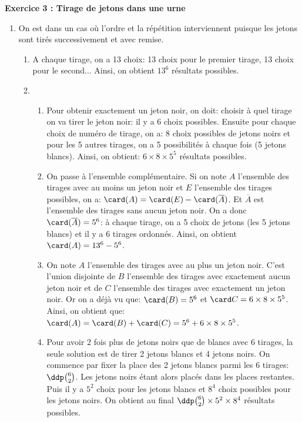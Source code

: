 \documentclass[a4paper, 11pt,reqno]{article}
\begin{document}
\begin{correction}  \; \textbf{Exercice 3 : Tirage de jetons dans une urne}
\begin{enumerate}
 \item On est dans un cas o\`u l'ordre et la r\'ep\'etition interviennent puisque les jetons sont tir\'es successivement et avec remise. 
\begin{enumerate}
\item A chaque tirage, on a 13 choix: 13 choix pour le premier tirage, 13 choix pour le second... Ainsi, on obtient $13^6$ r\'esultats possibles.
\item 
\begin{enumerate}
\item Pour obtenir exactement un jeton noir, on doit: choisir \`a quel tirage on va tirer le jeton noir: il y a 6 choix possibles. Ensuite pour chaque choix de num\'ero de tirage, on a: 8 choix possibles de jetons noirs et pour les 5 autres tirages, on a 5 possibilit\'es \`a chaque fois (5 jetons blancs). Ainsi, on obtient: $6\times 8\times 5^5$ r\'esultats possibles.
\item On passe \`a l'ensemble compl\'ementaire. Si on note $A$ l'ensemble des tirages avec au moins un jeton noir et $E$ l'ensemble des tirages possibles, on a: $\card (A)=\card (E)-\card (\overline{A})$. Et $\overline{A}$ est l'ensemble des tirages sans aucun jeton noir. On a donc $\card (\overline{A})=5^6$: \`a chaque tirage, on a 5 choix de jetons (les 5 jetons blancs) et il y a 6 tirages ordonn\'es. Ainsi, on obtient $\card (A)=13^6-5^6$.
\item On note $A$ l'ensemble des tirages avec au plus un jeton noir. C'est l'union disjointe de $B$ l'ensemble des tirages avec exactement aucun jeton noir et de $C$ l'ensemble des tirages avec exactement un jeton noir. Or on a d\'ej\`a vu que: $\card (B)=5^6$ et $\card C=6\times 8\times 5^5$. Ainsi, on obtient que: $\card (A)=\card (B)+\card (C)= 5^6 + 6\times 8\times 5^5$.
\item Pour avoir 2 fois plus de jetons noirs que de blancs avec 6 tirages, la seule solution est de tirer 2 jetons blancs et 4 jetons noirs. On commence par fixer la place des 2 jetons blancs parmi les 6 tirages: $\ddp \binom{6}{2}$. Les jetons noirs \'etant alors plac\'es dans les places restantes. Puis il y a $5^2$ choix pour les jetons blancs et $8^4$ choix possibles pour les jetons noirs. On obtient au final $\ddp \binom{6}{2}\times 5^2\times 8^4$ r\'esultats possibles.
\end{enumerate}
\end{enumerate}

\end{enumerate}
\end{correction}
\end{document}
